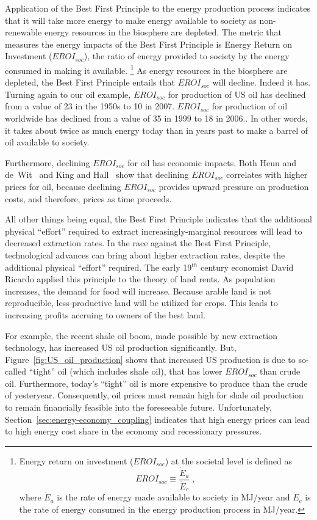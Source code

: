 Application of the Best First Principle to the energy production process 
indicates that it will take more energy 
to make energy available to society as non-renewable 
energy resources in the biosphere are depleted.
The metric that measures the energy impacts of the Best First Principle is 
Energy Return on Investment ($EROI_{soc}$), 
the ratio of energy provided to society 
by the energy consumed in making it available.%
	\footnote{
	Energy return on investment ($EROI_{soc}$) at the societal level is defined as 
	\begin{equation}
		EROI_{soc} \equiv \frac{\dot{E}_a}{\dot{E}_c} \; ,
	\end{equation}
	where $\dot{E}_a$ is the rate of energy made available to society in MJ/year
	and $\dot{E}_c$ is the rate of energy consumed in the energy production process in MJ/year.
	}
As energy resources in the biosphere are depleted, 
the Best First Principle entails that
$EROI_{soc}$ will decline.
Indeed it has.
Turning again to our oil example, $EROI_{soc}$ for production of US oil has declined 
from a value of 23 in the 1950s
to 10 in 2007.\cite[Fig.~2]{Guilford:2011ci}
$EROI_{soc}$ for production of oil worldwide has declined 
from a value of 35 in 1999
to 18 in 2006.\cite[Fig.~1]{Gagnon:2009fc}.
In other words, it takes about twice as much energy today
than in years past
to make a barrel of oil available to society.

Furthermore, declining $EROI_{soc}$ for oil has economic impacts.
Both Heun and de~Wit~\cite{Heun:2012ek} and King and Hall~\cite{King:2011go}
show that declining $EROI_{soc}$ correlates with higher prices for oil, 
because declining $EROI_{soc}$ provides upward pressure on 
production costs, and therefore, prices
as time proceeds.

All other things being equal, the Best First Principle
indicates that the additional physical ``effort'' required to extract
increasingly-marginal resources will lead to decreased extraction rates.
In the race against the Best First Principle,
technological advances can bring about higher extraction rates, 
despite the additional physical ``effort'' required. 
The early 19$^{th}$ century economist David Ricardo applied this 
principle to the theory of land rents. 
As population increases, 
the demand for food will increase. 
Because arable land is not reproducible, 
less-productive land will be utilized for crops. 
This leads to increasing profits accruing to owners of the best land.

For example, the recent shale oil boom, made possible by new extraction technology,
has increased US oil production significantly. 
But, Figure~\ref{fig:US_oil_production} shows that increased US production
is due to so-called ``tight'' oil (which includes shale oil), 
that has lower $EROI_{soc}$ than crude oil.\cite{Cleveland:2010aa}
Furthermore, today's ``tight'' oil is more expensive to produce 
than the crude of yesteryear.
Consequently, oil prices must remain high for 
shale oil production to remain financially feasible into the foreseeable future. 
Unfortunately, Section~\ref{sec:energy-economy_coupling} indicates that
high energy prices can lead to high energy cost share in the economy
and recessionary pressures.

